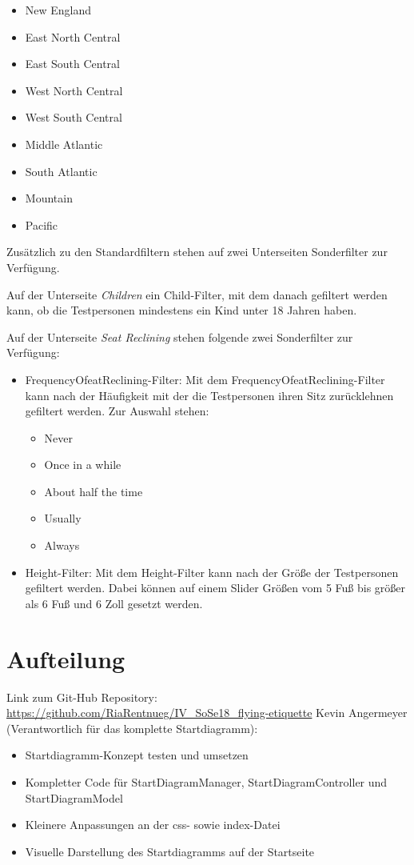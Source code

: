\documentclass{mi-seminar}
\begin{document}
\begin{itemize}
	\begin{itemize}
	\item New England
	\item East North Central
	\item East South Central
	\item West North Central
	\item West South Central
	\item Middle Atlantic
	\item South Atlantic
	\item Mountain
	\item Pacific
	\end{itemize}
\end{itemize}

Zusätzlich zu den Standardfiltern stehen auf zwei Unterseiten Sonderfilter zur Verfügung. 

Auf der Unterseite \textit{Children} ein Child-Filter, mit dem danach gefiltert werden kann, ob die Testpersonen mindestens ein Kind unter 18 Jahren haben. 

Auf der Unterseite \textit{Seat Reclining} stehen folgende zwei Sonderfilter zur Verfügung: 
\begin{itemize}
\item FrequencyOfeatReclining-Filter: Mit dem FrequencyOfeatReclining-Filter kann nach der Häufigkeit mit der die Testpersonen ihren Sitz zurücklehnen gefiltert werden. Zur Auswahl stehen:
	\begin{itemize}
	\item Never
	\item Once in a while
	\item About half the time
	\item Usually
	\item Always
	\end{itemize}
\item Height-Filter: Mit dem Height-Filter kann nach der Größe der Testpersonen gefiltert werden. Dabei können auf einem Slider Größen vom 5 Fuß bis größer als 6 Fuß und 6 Zoll gesetzt werden.
\end{itemize} 

\section{Aufteilung}
Link zum Git-Hub Repository: \newline
\href{https://github.com/RiaRentnueg/IV_SoSe18_flying-etiquette}{https://github.com/RiaRentnueg/IV\_SoSe18\_flying-etiquette}
\linebreak \newline
Kevin Angermeyer (Verantwortlich für das komplette Startdiagramm):
\begin{itemize}
\item Startdiagramm-Konzept testen und umsetzen
\item Kompletter Code für StartDiagramManager, StartDiagramController und StartDiagramModel 
\item Kleinere Anpassungen an der css- sowie index-Datei
\item Visuelle Darstellung des Startdiagramms auf der Startseite
\end{itemize}
\end{document}
